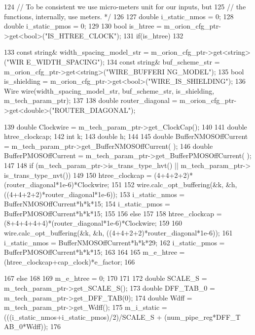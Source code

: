 \begin{DoxyCode}
{124     // To be consistent we use micro-meters unit for our inputs, but 
125     // the functions, internally, use meters. */
126 
127     double i_static_nmos = 0;
128     double i_static_pmos = 0;
129 
130     bool is_htree = m_orion_cfg_ptr->get<bool>("IS_HTREE_CLOCK");
131     if(is_htree)
132     {
133         const string& width_spacing_model_str = m_orion_cfg_ptr->get<string>("WIR
      E_WIDTH_SPACING");
134         const string& buf_scheme_str = m_orion_cfg_ptr->get<string>("WIRE_BUFFERI
      NG_MODEL");
135         bool is_shielding = m_orion_cfg_ptr->get<bool>("WIRE_IS_SHIELDING");
136         Wire wire(width_spacing_model_str, buf_scheme_str, is_shielding, 
      m_tech_param_ptr);
137 
138         double router_diagonal = m_orion_cfg_ptr->get<double>("ROUTER_DIAGONAL");
      
139         double Clockwire = m_tech_param_ptr->get_ClockCap();
140 
141         double htree_clockcap;
142         int k;
143         double h;
144 
145         double BufferNMOSOffCurrent = m_tech_param_ptr->get_BufferNMOSOffCurrent(
      );
146         double BufferPMOSOffCurrent = m_tech_param_ptr->get_BufferPMOSOffCurrent(
      );
147 
148         if (m_tech_param_ptr->is_trans_type_hvt() || m_tech_param_ptr->
      is_trans_type_nvt())
149         {
150             htree_clockcap = (4+4+2+2)*(router_diagonal*1e-6)*Clockwire;
151 
152             wire.calc_opt_buffering(&k, &h, ((4+4+2+2)*router_diagonal*1e-6));
153             i_static_nmos = BufferNMOSOffCurrent*h*k*15;
154             i_static_pmos = BufferPMOSOffCurrent*h*k*15;
155         }
156         else
157         {
158             htree_clockcap = (8+4+4+4+4)*(router_diagonal*1e-6)*Clockwire;
159 
160             wire.calc_opt_buffering(&k, &h, ((4+4+2+2)*router_diagonal*1e-6));  
161             i_static_nmos = BufferNMOSOffCurrent*h*k*29;
162             i_static_pmos = BufferPMOSOffCurrent*h*k*15;
163         }
164 
165         m_e_htree = (htree_clockcap+cap_clock)*e_factor;
166     }
167     else
168     {
169         m_e_htree = 0;
170     }
171 
172     double SCALE_S = m_tech_param_ptr->get_SCALE_S();
173     double DFF_TAB_0 = m_tech_param_ptr->get_DFF_TAB(0);
174     double Wdff = m_tech_param_ptr->get_Wdff();
175     m_i_static = (((i_static_nmos+i_static_pmos)/2)/SCALE_S + (num_pipe_reg*DFF_T
      AB_0*Wdff));
176 }
\end{DoxyCode}


